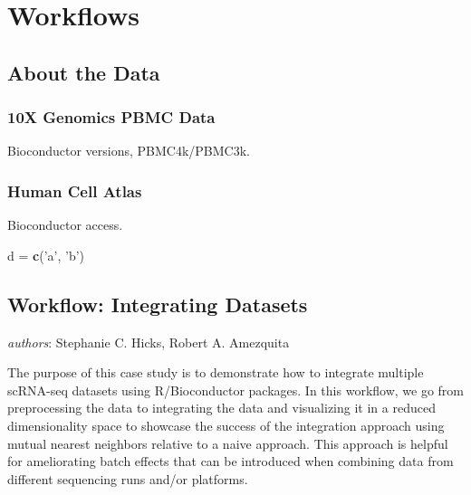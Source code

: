 \documentclass[]{book}
\newenvironment{Shaded}{\begin{snugshade}}{\end{snugshade}}
\newcommand{\KeywordTok}[1]{\textcolor[rgb]{0.13,0.29,0.53}{\textbf{#1}}}
\newcommand{\NormalTok}[1]{#1}
\newcommand{\StringTok}[1]{\textcolor[rgb]{0.31,0.60,0.02}{#1}}
\begin{document}
\hypertarget{part-workflows}{%
\part{Workflows}\label{part-workflows}}

\hypertarget{about-the-data}{%
\chapter{About the Data}\label{about-the-data}}

\hypertarget{x-genomics-pbmc-data}{%
\section{10X Genomics PBMC Data}\label{x-genomics-pbmc-data}}

Bioconductor versions, PBMC4k/PBMC3k.

\hypertarget{human-cell-atlas}{%
\section{Human Cell Atlas}\label{human-cell-atlas}}

Bioconductor access.

\begin{Shaded}
\begin{Highlighting}[]
\NormalTok{d =}\StringTok{ }\KeywordTok{c}\NormalTok{(}\StringTok{'a'}\NormalTok{, }\StringTok{'b'}\NormalTok{)}
\end{Highlighting}
\end{Shaded}

\hypertarget{workflow-integrating-datasets}{%
\chapter{Workflow: Integrating Datasets}\label{workflow-integrating-datasets}}

\emph{authors}: Stephanie C. Hicks, Robert A. Amezquita

The purpose of this case study is to demonstrate how to integrate multiple scRNA-seq datasets using R/Bioconductor packages. In this workflow, we go from preprocessing the data to integrating the data and visualizing it in a reduced dimensionality space to showcase the success of the integration approach using mutual nearest neighbors relative to a naive approach. This approach is helpful for ameliorating batch effects that can be introduced when combining data from different sequencing runs and/or platforms.
\end{document}
